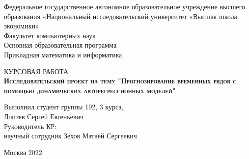 \begin{titlepage}
\newpage

{
\begin{center}
Федеральное государственное автономное образовательное учреждение высшего образования «Национальный исследовательский университет «Высшая школа экономики»
\\
\bigskip
Факультет компьютерных наук \\
Основная образовательная программа \\
Прикладная математика и информатика \\
\end{center}
}

\vspace{8em}

\begin{center}
{\Large КУРСОВАЯ РАБОТА}\\
\textsc{\textbf{
Исследовательский проект на тему
\linebreak
"Прогнозирование временных рядов с помощью динамических авторегрессионных моделей"}}
\end{center}

\vspace{2em}

{
\hfill\parbox{16cm}{
\hspace*{5cm}\hspace*{-5cm}Выполнил студент группы 192, 3 курса,\\
 Лоптев Сергей Евгеньевич\\
 
\hspace*{5cm}\hspace*{-5cm}Руководитель КР:\\
научный сотрудник Зехов Матвей Сергеевич\\


}
}

\vspace{\fill}

\begin{center}
Москва 2022
\end{center}

\end{titlepage}